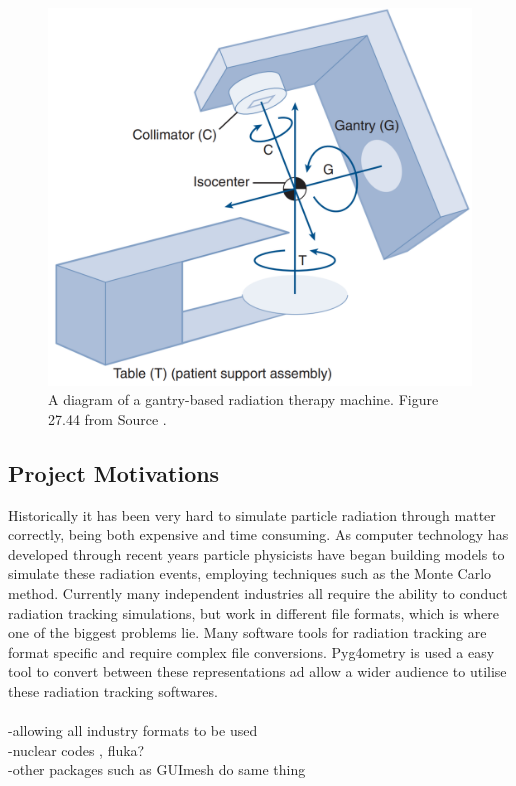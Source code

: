 \documentclass[12pt,a4paper]{article}
\begin{document}
\begin{figure}[h!]
\centering
\includegraphics[scale=0.35]{Images//introduction//radiotherapy.png}
\caption[width=\columnwidth]{A diagram of a gantry-based radiation therapy machine. Figure 27.44 from Source \cite{cancer}.}
\label{cancer}
\end{figure}

\subsection{Project Motivations}
\label{motiv}
\noindent Historically it has been very hard to simulate particle radiation through matter correctly, being both expensive and time consuming. As computer technology has developed through recent years particle physicists have began building models to simulate these radiation events, employing techniques such as the Monte Carlo method. Currently many independent industries all require the ability to conduct radiation tracking simulations, but work in different file formats, which is where one of the biggest problems lie. Many software tools for radiation tracking are format specific and require complex file conversions. Pyg4ometry is used a easy tool to convert between these representations ad allow a wider audience to utilise these radiation tracking softwares.
\\\\
-allowing all industry formats to be used\\
-nuclear codes , fluka?\\
-other packages such as GUImesh do same thing\\
\end{document}
